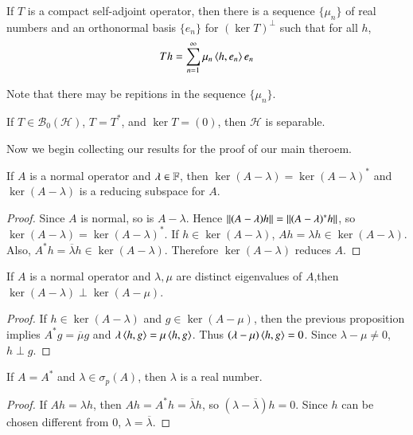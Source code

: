 \begin{cor}
    If $T$ is a compact self-adjoint operator, then there is a sequence $\{\mu_n\}$ of real numbers and an orthonormal basis $\{e_n\}$ for $(\ker T)^{\perp}$ such that for all $h$, $$Th = \sum_{n=1}^{\infty}\mu_n\left\langle h, e_n\right\rangle e_n$$
\end{cor}
Note that there may be repitions in the sequence $\{\mu_n\}$.

\begin{cor}
    If $T \in \mathscr{B}_0(\mathscr{H})$, $T = T^*$, and $\ker T = (0)$, then $\mathscr{H}$ is separable.
\end{cor}

Now we begin collecting our results for the proof of our main theroem.

\begin{prop}
    If $A$ is a normal operator and $\lambda \in \mathbb F$, then $\ker(A-\lambda) = \ker(A-\lambda)^*$ and $\ker(A-\lambda)$ is a reducing subspace for $A$.
\end{prop}
\begin{proof}
    Since $A$ is normal, so is $A-\lambda$. Hence $\left|\left| (A-\lambda)h\right|\right| = \left|\left| (A-\lambda)^*h\right|\right|$, so $\ker(A-\lambda) = \ker(A-\lambda)^*$. If $h \in \ker(A-\lambda)$, $Ah = \lambda h \in \ker(A-\lambda)$. Also, $A^*h = \overline{\lambda}h \in \ker(A-\lambda)$. Therefore $\ker(A-\lambda)$ reduces $A$.
\end{proof}

\begin{prop}
    If $A$ is a normal operator and $\lambda,\mu$ are distinct eigenvalues of $A$,then $\ker(A-\lambda)\perp \ker(A-\mu)$.
\end{prop}
\begin{proof}
    If $h \in \ker(A-\lambda)$ and $g \in \ker(A-\mu)$, then the previous proposition implies $A^*g = \overline{\mu}g$ and $\lambda \left\langle h, g\right\rangle = \mu\left\langle h, g\right\rangle$. Thus $(\lambda-\mu)\left\langle h, g\right\rangle = 0$. Since $\lambda - \mu \neq 0$, $h\perp g$.
\end{proof}

\begin{prop}
    If $A = A^* $ and $\lambda \in \sigma_p(A)$, then $\lambda$ is a real number.
\end{prop}
\begin{proof}
    If $Ah = \lambda h$, then $Ah = A^*h = \overline{\lambda}h$, so $(\lambda-\overline{\lambda})h = 0$. Since $h$ can be chosen different from $0$, $\lambda = \overline{\lambda}$.
\end{proof}

